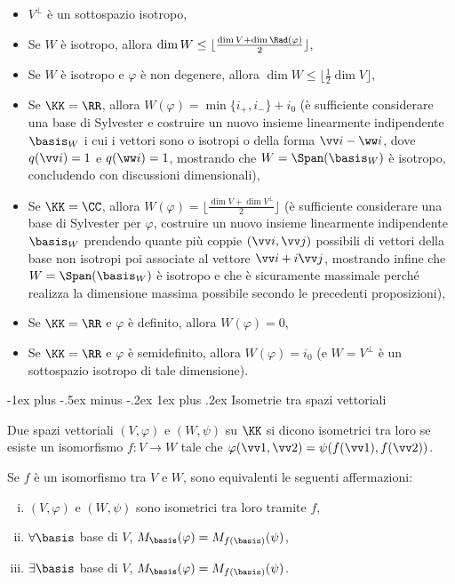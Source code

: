 \documentclass[10pt,landscape]{article}
\makeatletter
\renewcommand{\subsubsection}{\@startsection{subsubsection}{3}{0mm}%
	{-1ex plus -.5ex minus -.2ex}%
	{1ex plus .2ex}%
	{\normalfont\small\bfseries}}
\makeatother
\begin{document}
\begin{multicols}{3}
		\begin{itemize}
			\item $V^\perp$ è un sottospazio isotropo,
			\item Se $W$ è isotropo, allora $\dim W \leq  \lfloor \frac{\dim V + \dim \Rad(\varphi)}{2} \rfloor$,
			\item Se $W$ è isotropo e $\varphi$ è non degenere, allora $\dim W \leq \lfloor \frac{1}{2} \dim V \rfloor$,
			\item Se $\KK = \RR$, allora $W(\varphi) = \min\{ i_+, i_- \} + i_0$ (è sufficiente considerare
			una base di Sylvester e costruire un nuovo insieme linearmente indipendente $\basis_W$ i cui i vettori sono o isotropi o della forma $\vv i - \ww i$, dove $q(\vv i) = 1$ e $q(\ww i) = 1$, mostrando che $W = \Span(\basis_W)$ è isotropo, concludendo con discussioni dimensionali),
			\item Se $\KK = \CC$, allora $W(\varphi) = \lfloor \frac{\dim V + \dim V^\perp}{2} \rfloor$ (è sufficiente considerare una base di Sylvester per $\varphi$, costruire un nuovo insieme linearmente indipendente $\basis_W$ prendendo quante più coppie $(\vv i, \vv j)$ possibili di vettori della base non isotropi poi associate al vettore $\vv i + i \vv j$, mostrando infine che $W = \Span(\basis_W)$ è isotropo e che è sicuramente massimale perché realizza la dimensione massima possibile secondo le precedenti proposizioni),
			\item Se $\KK=\RR$ e $\varphi$ è definito, allora $W(\varphi) = 0$,
			\item Se $\KK=\RR$ e $\varphi$ è semidefinito, allora $W(\varphi) = i_0$ (e $W = V^\perp$ è un sottospazio
			isotropo di tale dimensione).
		\end{itemize}
		
		\subsubsection{Isometrie tra spazi vettoriali}

		Due spazi vettoriali $(V, \varphi)$ e $(W, \psi)$ su $\KK$ si dicono isometrici tra loro se
		esiste un isomorfismo $f : V \to W$ tale che $\varphi(\vv 1, \vv 2) = \psi(f(\vv 1), f(\vv 2))$.

		Se $f$ è un isomorfismo tra $V$ e $W$, sono equivalenti le seguenti affermazioni:

		\begin{enumerate}[(i)]
			\item $(V, \varphi)$ e $(W, \psi)$ sono isometrici tra loro tramite $f$,
			\item $\forall \basis$ base di $V$, $M_\basis(\varphi) = M_{f(\basis)}(\psi)$,
			\item $\exists \basis$ base di $V$, $M_\basis(\varphi) = M_{f(\basis)}(\psi)$.
		\end{enumerate}
		

\end{multicols}
\end{document}
